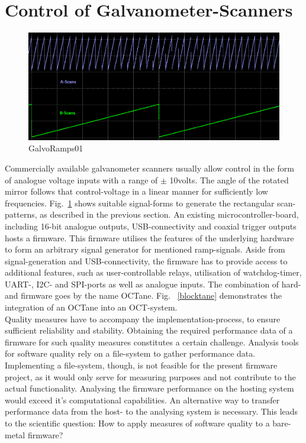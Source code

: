 \section{Control of Galvanometer-Scanners}
\begin{figure}[h!]	\centering	\includegraphics[width=\textwidth]{images/GalvoRamps01.png}	\caption{GalvoRamps01}	\label{GalvoRamps01}	\end{figure}
Commercially available galvanometer scanners usually allow control in the form of analogue voltage inputs with a range of $\pm$ 10volts. The angle of the rotated mirror follows that control-voltage in a linear manner for sufficiently low frequencies. Fig.~\ref{GalvoRamps01} shows suitable signal-forms to generate the rectangular scan-patterns, as described in the previous section. An existing microcontroller-board, including 16-bit analogue outputs, USB-connectivity and coaxial trigger outputs hosts a firmware. This firmware utilises the features of the underlying hardware to form an arbitrary signal generator for mentioned ramp-signals. Aside from signal-generation and USB-connectivity, the firmware has to provide access to additional features, such as user-controllable relays, utilisation of watchdog-timer, UART-, I2C- and SPI-ports as well as analogue inputs. The combination of hard- and firmware goes by the name OCTane. Fig. ~\ref{blocktane} demonstrates the integration of an OCTane into an OCT-system. \\ 
Quality measures have to accompany the implementation-process, to ensure sufficient reliability and stability. Obtaining the required performance data of a firmware for such quality measures constitutes a certain challenge. Analysis tools for software quality rely on a file-system to gather performance data. Implementing a file-system, though, is not feasible for the present firmware project, as it would only serve for measuring purposes and not contribute to the actual functionality. Analysing the firmware performance on the hosting system would exceed it's computational capabilities. An alternative way to transfer performance data from the host- to the analysing system is necessary. This leads to the scientific question: How to apply measures of software quality to a bare-metal firmware?



